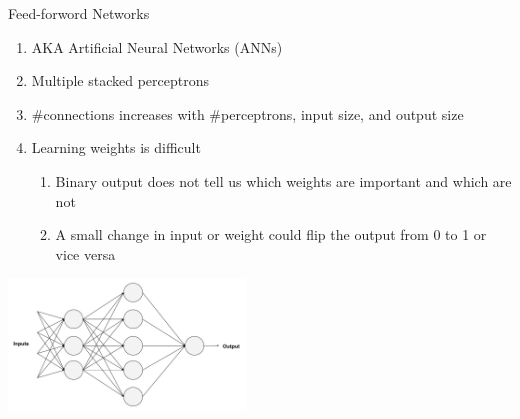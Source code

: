 \documentclass[handout]{beamer}
\begin{document}
\begin{frame}{Feed-forword Networks}
\begin{enumerate}
  \item AKA Artificial Neural Networks (ANNs) \\

  \item Multiple stacked perceptrons \\

  \item \#connections increases with \#perceptrons, input size, and output size \\

  \item Learning weights is difficult
    \begin{enumerate}
      \item Binary output does not tell us which weights are important and which are not \\
      \item A small change in input or weight could flip the output from 0 to 1 or vice versa \\
    \end{enumerate}
\end{enumerate}
    \begin{center}
      \includegraphics[width=0.65\linewidth, height=3.5cm]{images/anns}
    \end{center}
\end{frame}
\end{document}
